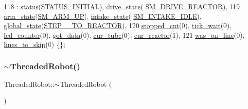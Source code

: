 \begin{DoxyCode}
118                     : \hyperlink{class_threaded_robot_a10f3a9d1b27ca8e7a1ada75323c75879}{status}(\hyperlink{_threaded_robot_8hpp_a9ba1d31706f568992789685278b59c6b}{STATUS\_INITIAL}), \hyperlink{class_threaded_robot_a8cc4fc4f00ff6566604f9499d427698a}{drive\_state}(
      \hyperlink{_threaded_robot_8hpp_ad8059005f360a46de99b00ca40801fec}{SM\_DRIVE\_REACTOR}),
119         \hyperlink{class_threaded_robot_a19026abe96d44213f7e8b3983be2d968}{arm\_state}(\hyperlink{_threaded_robot_8hpp_ab81e7b2b3227c0de1b76dcfdddb78f75}{SM\_ARM\_UP}), \hyperlink{class_threaded_robot_a832f25be64f45ff3297d3da9609a9391}{intake\_state}(
      \hyperlink{_threaded_robot_8hpp_a1ccedfbf469636f5afc2c68499f826a9}{SM\_INTAKE\_IDLE}), \hyperlink{class_threaded_robot_a92782be4dc437d7e84b04d20a39a5de3}{global\_state}(\hyperlink{_threaded_robot_8hpp_a388ca9e0532aeb38988df56f8226b6f9}{STEP\_\_TO\_REACTOR}),
120         \hyperlink{class_threaded_robot_a638cd7916d1c1c8a83d15c47a8fe6ef0}{stopped\_cnt}(0), \hyperlink{class_threaded_robot_a314047099d4d38a60d54cc8b81012c7c}{tick\_wait}(0), \hyperlink{class_threaded_robot_a857a1c5a3488176bd5a4bafc1b6d1d89}{led\_counter}(0), 
      \hyperlink{class_threaded_robot_a506989a00617c30a8a1930773a0b7d41}{got\_data}(0), \hyperlink{class_threaded_robot_ac68916b337d845b298d7e66f2f9261d7}{cur\_tube}(0), \hyperlink{class_threaded_robot_a3c2f2358f32ba58846b13e95b3c55527}{cur\_reactor}(1),
121         \hyperlink{class_threaded_robot_a8d78ef13e34e29ab23aafedcdddc4ae4}{was\_on\_line}(0), \hyperlink{class_threaded_robot_aacd340e703b54f0d3568c6c2bed974bf}{lines\_to\_skip}(0) \{\};
\end{DoxyCode}
\mbox{\label{class_threaded_robot_a67fb3fb389da8a81de483045806684e5}} 
\subsubsection{\texorpdfstring{$\sim$\+Threaded\+Robot()}{~ThreadedRobot()}}
{\footnotesize\ttfamily Threaded\+Robot\+::$\sim$\+Threaded\+Robot (\begin{DoxyParamCaption}{ }\end{DoxyParamCaption})\hspace{0.3cm}{\ttfamily [inline]}}



